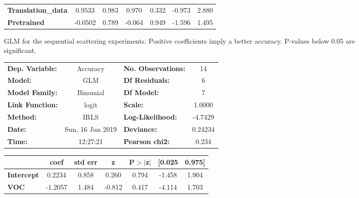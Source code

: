 \begin{figure}[!htb]
\begin{center}
\begin{tabular}{lcccccc}
			\textbf{Translation\_data} &       0.9533  &        0.983     &     0.970  &         0.332        &       -0.973    &        2.880     \\
			\textbf{Pretrained}        &      -0.0502  &        0.789     &    -0.064  &         0.949        &       -1.596    &        1.495     \\
			\bottomrule
		\end{tabular}
	\end{center}
\caption{GLM for the sequential scattering experiments. Positive coefficients imply a better accuracy. P-values below 0.05 are significant.}
\label{fig:GLM_sequential_scattering}
\end{figure}

\begin{figure}[!htb]
	\centering
	\begin{center}
		\begin{tabular}{lclc}
			\toprule
			\textbf{Dep. Variable:}    &     Accuracy     & \textbf{  No. Observations:  } &       14    \\
			\textbf{Model:}            &       GLM        & \textbf{  Df Residuals:      } &        6    \\
			\textbf{Model Family:}     &     Binomial     & \textbf{  Df Model:          } &        7    \\
			\textbf{Link Function:}    &      logit       & \textbf{  Scale:             } &    1.0000   \\
			\textbf{Method:}           &       IRLS       & \textbf{  Log-Likelihood:    } &   -4.7429   \\
			\textbf{Date:}             & Sun, 16 Jun 2019 & \textbf{  Deviance:          } &   0.24234   \\
			\textbf{Time:}             &     12:27:21     & \textbf{  Pearson chi2:      } &    0.234    \\
			\bottomrule
		\end{tabular}
		\begin{tabular}{lcccccc}
			& \textbf{coef} & \textbf{std err} & \textbf{z} & \textbf{P$>$$|$z$|$} & \textbf{[0.025} & \textbf{0.975]}  \\
			\midrule
			\textbf{Intercept}         &       0.2234  &        0.858     &     0.260  &         0.794        &       -1.458    &        1.904     \\
			\textbf{VOC}               &      -1.2057  &        1.484     &    -0.812  &         0.417        &       -4.114    &        1.703     \\

\end{tabular}
\end{center}
\end{figure}
